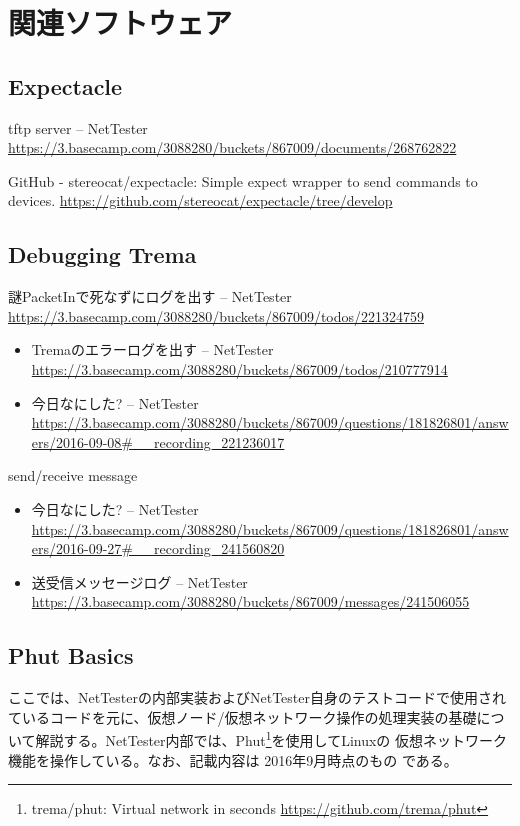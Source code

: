
\chapter{関連ソフトウェア}

 \section{Expectacle}

tftp server – NetTester \url{https://3.basecamp.com/3088280/buckets/867009/documents/268762822}

GitHub - stereocat/expectacle: Simple expect wrapper to send commands to devices. \url{https://github.com/stereocat/expectacle/tree/develop}

\section{Debugging Trema}

謎PacketInで死なずにログを出す – NetTester \url{https://3.basecamp.com/3088280/buckets/867009/todos/221324759}

\begin{itemize}
 \item Tremaのエラーログを出す – NetTester \url{https://3.basecamp.com/3088280/buckets/867009/todos/210777914}
 \item 今日なにした? – NetTester \url{https://3.basecamp.com/3088280/buckets/867009/questions/181826801/answers/2016-09-08#__recording_221236017}
\end{itemize}

send/receive message

\begin{itemize}
 \item 今日なにした? – NetTester \url{https://3.basecamp.com/3088280/buckets/867009/questions/181826801/answers/2016-09-27#__recording_241560820}
 \item 送受信メッセージログ – NetTester \url{https://3.basecamp.com/3088280/buckets/867009/messages/241506055}
\end{itemize}

\section{Phut Basics}

ここでは、NetTesterの内部実装およびNetTester自身のテストコードで使用され
ているコードを元に、仮想ノード/仮想ネットワーク操作の処理実装の基礎につ
いて解説する。NetTester内部では、Phut\footnote{trema/phut: Virtual
network in seconds \url{https://github.com/trema/phut}}を使用してLinuxの
仮想ネットワーク機能を操作している。なお、記載内容は 2016年9月時点のもの
である。

